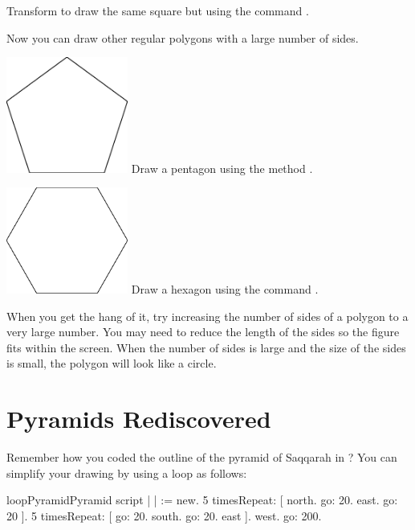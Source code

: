 \begin{exonofig}\label{exo:squareRepeat}
Transform   to
draw the same square but using the command \timesRepeat.
\end{exonofig}

Now you can draw other regular polygons with a large number of sides.


\begin{exofigwithsize}{\includegraphics[width=4cm]{loopPentagon}} \label{exo:pentagonRepeat}
Draw a pentagon using the method \timesRepeat.
\end{exofigwithsize}

\begin{exofigwithsize}{\includegraphics[width=4cm]{loopHexagon}}\label{exo:hexagonRepeat}
Draw a hexagon using the command \timesRepeat.
\end{exofigwithsize}


When you get the hang of it, try increasing the number of sides of a polygon to a very large number. You may need to reduce the length of the sides so the figure fits within the screen. When the number of sides is large and   the size of the sides is small, the
polygon will look like a circle.


\section{Pyramids Rediscovered}\label{sec:bouclonpyramids}
Remember how you coded the outline of the pyramid of Saqqarah in
? You can simplify your drawing by using a loop 
as follows:

\begin{scriptfig}{loopPyramid}{Pyramid script} \label{scr:pyramid}
| \caro |
\caro := \Turtle new.
5 timesRepeat: 
     [ \caro north.
     \caro go: 20.
     \caro east.
     \caro go: 20 ].
5 timesRepeat: 
     [ \caro go: 20.
     \caro south.
     \caro go: 20.
     \caro east ].
\caro west.
\caro go: 200.
\end{scriptfig}

